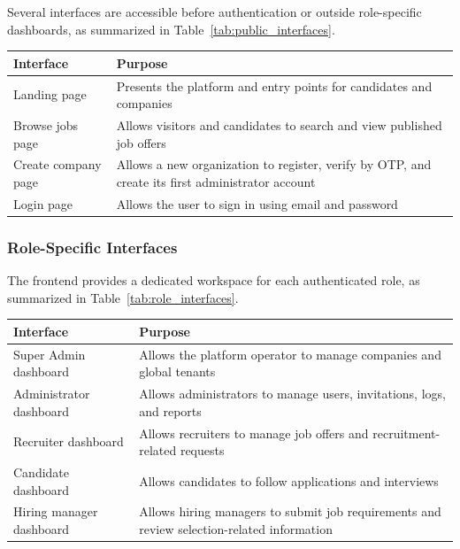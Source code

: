 Several interfaces are accessible before authentication or outside role-specific dashboards, as summarized in Table~\ref{tab:public_interfaces}.

\begin{center}
\label{tab:public_interfaces}
\renewcommand{\arraystretch}{0.8}
\begin{tabularx}{\textwidth}{|p{4cm}|X|}
\hline
\rowcolor{gray!20} \textbf{Interface} & \textbf{Purpose} \\
\hline
Landing page & Presents the platform and entry points for candidates and companies \\
\hline
Browse jobs page & Allows visitors and candidates to search and view published job offers \\
\hline
Create company page & Allows a new organization to register, verify by OTP, and create its first administrator account \\
\hline
Login page & Allows the user to sign in using email and password \\
\hline
\end{tabularx}
\end{center}

\subsubsection{Role-Specific Interfaces}

The frontend provides a dedicated workspace for each authenticated role, as summarized in Table~\ref{tab:role_interfaces}.

\begin{center}
\label{tab:role_interfaces}
\renewcommand{\arraystretch}{0.8}
\begin{tabularx}{\textwidth}{|p{4cm}|X|}
\hline
\rowcolor{gray!20} \textbf{Interface} & \textbf{Purpose} \\
\hline
Super Admin dashboard & Allows the platform operator to manage companies and global tenants \\
\hline
Administrator dashboard & Allows administrators to manage users, invitations, logs, and reports \\
\hline
Recruiter dashboard & Allows recruiters to manage job offers and recruitment-related requests \\
\hline
Candidate dashboard & Allows candidates to follow applications and interviews \\
\hline
Hiring manager dashboard & Allows hiring managers to submit job requirements and review selection-related information \\
\hline
\end{tabularx}
\end{center}

